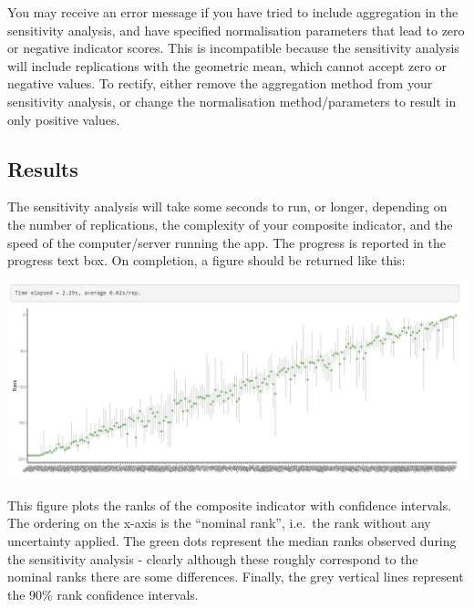 \documentclass[
  letterpaper,
  DIV=11,
  numbers=noendperiod]{scrreprt}
\begin{document}
\begin{tcolorbox}[enhanced jigsaw, breakable, colbacktitle=quarto-callout-caution-color!10!white, leftrule=.75mm, rightrule=.15mm, bottomtitle=1mm, coltitle=black, colback=white, bottomrule=.15mm, colframe=quarto-callout-caution-color-frame, opacityback=0, opacitybacktitle=0.6, toptitle=1mm, left=2mm, title=\textcolor{quarto-callout-caution-color}{\faFire}\hspace{0.5em}{Caution}, toprule=.15mm, titlerule=0mm, arc=.35mm]

You may receive an error message if you have tried to include
aggregation in the sensitivity analysis, and have specified
normalisation parameters that lead to zero or negative indicator scores.
This is incompatible because the sensitivity analysis will include
replications with the geometric mean, which cannot accept zero or
negative values. To rectify, either remove the aggregation method from
your sensitivity analysis, or change the normalisation method/parameters
to result in only positive values.

\end{tcolorbox}

\hypertarget{results}{%
\subsection{Results}\label{results}}

The sensitivity analysis will take some seconds to run, or longer,
depending on the number of replications, the complexity of your
composite indicator, and the speed of the computer/server running the
app. The progress is reported in the progress text box. On completion, a
figure should be returned like this:

\includegraphics[width=1\textwidth,height=\textheight]{figs/sensitivity_1.png}

This figure plots the ranks of the composite indicator with confidence
intervals. The ordering on the x-axis is the ``nominal rank'', i.e.~the
rank without any uncertainty applied. The green dots represent the
median ranks observed during the sensitivity analysis - clearly although
these roughly correspond to the nominal ranks there are some
differences. Finally, the grey vertical lines represent the 90\% rank
confidence intervals.
\end{document}
